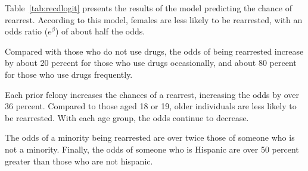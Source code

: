Table~\ref{tab:recdlogit} presents the results of the model predicting the chance of rearrest.  According to this model, females are less likely to be rearrested, with an odds ratio ($e^\beta$) of about half the odds.

Compared with those who do not use drugs, the odds of being rearrested increase by about 20 percent for those who use drugs occasionally, and about 80 percent for those who use drugs frequently.

Each prior felony increases the chances of a rearrest, increasing the odds by over 36 percent. Compared to those aged 18 or 19, older individuals are less likely to be rearrested. With each age group, the odds continue to decrease.

The odds of a minority being rearrested are over twice those of someone who is not a minority.  Finally, the odds of someone who is Hispanic are over 50 percent greater than those who are not hispanic.


